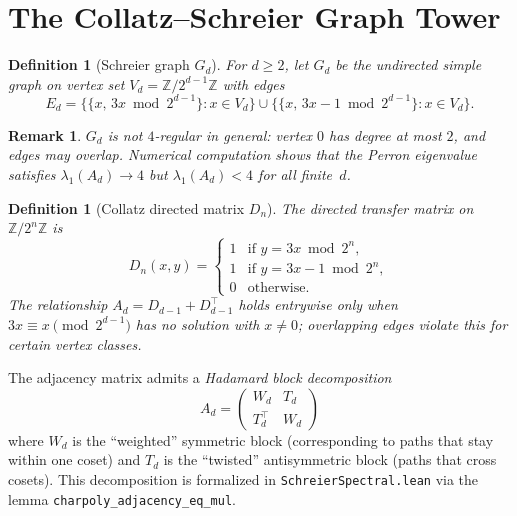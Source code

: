 \documentclass[12pt]{article}
\newtheorem{definition}[theorem]{Definition}
\newtheorem{remark}[theorem]{Remark}
\newcommand{\Z}{\mathbb{Z}}
\newcommand{\Zmod}[1]{\Z/2^{#1}\Z}
\begin{document}
\section{The Collatz--Schreier Graph Tower}
\label{sec:graphs}

\begin{definition}[Schreier graph $G_d$]
  For $d \ge 2$, let $G_d$ be the undirected simple graph on vertex set
  $V_d = \Zmod{d-1}$ with edges
  \[
    E_d = \bigl\{\{x,\, 3x \bmod 2^{d-1}\} : x \in V_d\bigr\}
          \cup
          \bigl\{\{x,\, 3x - 1 \bmod 2^{d-1}\} : x \in V_d\bigr\}.
  \]
\end{definition}

\begin{remark}
  $G_d$ is \emph{not} $4$-regular in general: vertex $0$ has degree at
  most $2$, and edges may overlap.  Numerical computation shows that the
  Perron eigenvalue satisfies $\lambda_1(A_d) \to 4$ but
  $\lambda_1(A_d) < 4$ for all finite~$d$.
\end{remark}

\begin{definition}[Collatz directed matrix $D_n$]
  The directed transfer matrix on $\Zmod{n}$ is
  \[
    D_n(x, y) = \begin{cases}
      1 & \text{if } y = 3x \bmod 2^n,\\
      1 & \text{if } y = 3x - 1 \bmod 2^n,\\
      0 & \text{otherwise.}
    \end{cases}
  \]
  The relationship $A_d = D_{d-1} + D_{d-1}^{\!\top}$ holds
  \emph{entrywise} only when $3x \equiv x \pmod{2^{d-1}}$ has no
  solution with $x \ne 0$; overlapping edges violate this for certain
  vertex classes.
\end{definition}

The adjacency matrix admits a \emph{Hadamard block decomposition}
\[
  A_d = \begin{pmatrix} W_d & T_d \\ T_d^{\!\top} & W_d \end{pmatrix}
\]
where $W_d$ is the ``weighted'' symmetric block (corresponding to paths
that stay within one coset) and $T_d$ is the ``twisted'' antisymmetric
block (paths that cross cosets).  This decomposition is formalized in
\texttt{SchreierSpectral.lean} via the lemma
\texttt{charpoly\_adjacency\_eq\_mul}.
\end{document}
